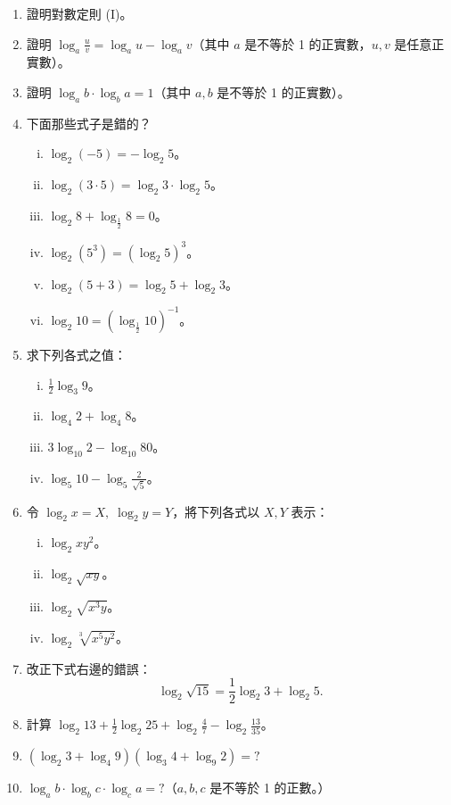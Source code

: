 \begin{enumerate}
    \item 證明對數定則 (I)。
    \item 證明 $\log_a \frac{u}{v} = \log_a u - \log_a v$（其中 $a$ 是不等於 1 的正實數，$u, v$ 是任意正實數）。
    \item 證明 $\log_a b \cdot \log_b a = 1$（其中 $a, b$ 是不等於 1 的正實數）。
    \item 下面那些式子是錯的？
    \begin{enumerate}[(i)]
        \item $\log_2(-5) = -\log_2 5$。
        \item $\log_2(3\cdot 5) = \log_2 3 \cdot \log_2 5$。
        \item $\log_2 8 + \log_{\frac{1}{2}} 8 = 0$。
        \item $\log_2(5^3) = (\log_2 5)^3$。
        \item $\log_2(5+3) = \log_2 5 + \log_2 3$。
        \item $\log_2 10 = (\log_{\frac{1}{2}} 10)^{-1}$。
    \end{enumerate}
    \item 求下列各式之值：
    \begin{enumerate}[(i)]
        \item $\frac{1}{2}\log_3 9$。
        \item $\log_4 2 + \log_4 8$。
        \item $3\log_{10} 2 - \log_{10} 80$。
        \item $\log_5 10 - \log_5 \frac{2}{\sqrt{5}}$。
    \end{enumerate}
    \item 令 $\log_2 x = X,\; \log_2 y = Y$，將下列各式以 $X, Y$ 表示：
    \begin{enumerate}[(i)]
        \item $\log_2 xy^2$。
        \item $\log_2 \sqrt{xy}$。
        \item $\log_2 \sqrt{x^3 y}$。
        \item $\log_2 \sqrt[3]{x^5 y^2}$。
    \end{enumerate}
    \item 改正下式右邊的錯誤：
    \[
    \log_2 \sqrt{15} = \frac{1}{2}\log_2 3 + \log_2 5.
    \]
    \item 計算 $\log_2 13 + \frac{1}{2}\log_2 25 + \log_2 \frac{4}{7} - \log_2 \frac{13}{35}$。
    \item $(\log_2 3 + \log_4 9)(\log_3 4 + \log_9 2) = {?}$
    \item $\log_a b \cdot \log_b c \cdot \log_c a = {?}$（$a, b, c$ 是不等於 1 的正數。）
\end{enumerate}

